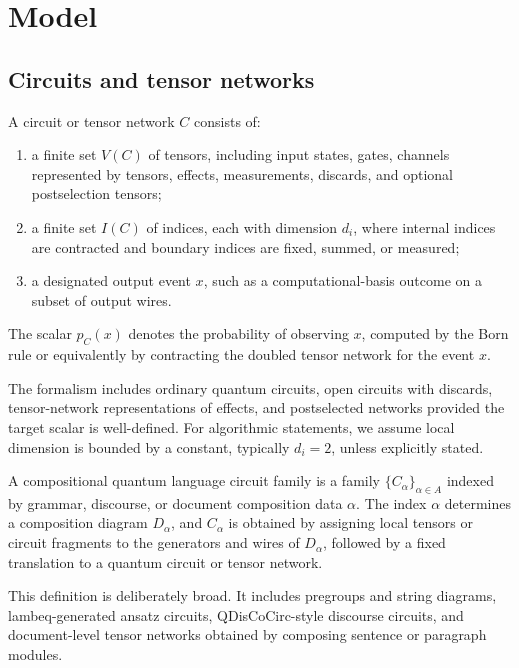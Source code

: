 \section{Model}
\label{sec:model}

\subsection{Circuits and tensor networks}

\begin{definition}
A circuit or tensor network \(C\) consists of:
\begin{enumerate}[leftmargin=1.2cm]
\item a finite set \(V(C)\) of tensors, including input states, gates, channels represented by tensors, effects, measurements, discards, and optional postselection tensors;
\item a finite set \(I(C)\) of indices, each with dimension \(d_i\), where internal indices are contracted and boundary indices are fixed, summed, or measured;
\item a designated output event \(x\), such as a computational-basis outcome on a subset of output wires.
\end{enumerate}
The scalar \(p_C(x)\) denotes the probability of observing \(x\), computed by the Born rule or equivalently by contracting the doubled tensor network for the event \(x\).
\end{definition}

The formalism includes ordinary quantum circuits, open circuits with discards, tensor-network representations of effects, and postselected networks provided the target scalar is well-defined. For algorithmic statements, we assume local dimension is bounded by a constant, typically \(d_i=2\), unless explicitly stated.

\begin{definition}
A compositional quantum language circuit family is a family \(\{C_\alpha\}_{\alpha\in A}\) indexed by grammar, discourse, or document composition data \(\alpha\). The index \(\alpha\) determines a composition diagram \(D_\alpha\), and \(C_\alpha\) is obtained by assigning local tensors or circuit fragments to the generators and wires of \(D_\alpha\), followed by a fixed translation to a quantum circuit or tensor network.
\end{definition}

This definition is deliberately broad. It includes pregroups and string diagrams, lambeq-generated ansatz circuits, QDisCoCirc-style discourse circuits, and document-level tensor networks obtained by composing sentence or paragraph modules.

